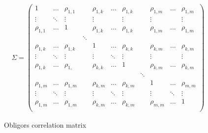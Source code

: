 \documentclass[a4paper,12pt,final]{article}
\begin{document}
\begin{figure}[h!]
\begin{displaymath}
\begin{array}{c}
\Sigma=
\left(
\begin{array}{ccccccccccc}
1           & \dots    & \rho_{1,1}  &          & \rho_{1,k}  & \dots   & \rho_{1,k}  &         & \rho_{1,m}  & \dots      & \rho_{1,m}  \\
\vdots      & \ddots   & \vdots      &          & \vdots      &         & \vdots      &         & \vdots      &            & \vdots      \\
\rho_{1,1}  & \dots    & 1           &          & \rho_{1,k}  & \dots   & \rho_{1,k}  &         & \rho_{1,m}  & \dots      & \rho_{1,m}  \\

            &          &             & \ddots   &             &         &             &         &             &            &             \\

\rho_{1,k}  & \dots    & \rho_{1,k}  &          & 1           & \dots   & \rho_{k,k}  &         & \rho_{k,m}  & \dots      & \rho_{k,m}  \\
\vdots      & \ddots   & \vdots      &          & \vdots      & \ddots  & \vdots      &         & \vdots      &            & \vdots      \\
\rho_{1,k}  & \dots    & \rho_{1, }  &          & \rho_{k,k}  & \dots   & 1           &         & \rho_{k,m}  & \dots      & \rho_{k,m}  \\

            &          &             &          &             &         &             & \ddots  &             &            &             \\

\rho_{1,m}  & \dots    & \rho_{1,m}  &          & \rho_{k,m}  & \dots   & \rho_{k,m}  &         & 1           & \dots      & \rho_{m,m}  \\
\vdots      & \ddots   & \vdots      &          & \vdots      & \ddots  & \vdots      &         & \vdots      & \ddots     & \vdots      \\
\rho_{1,m}  & \dots    & \rho_{1,m}  &          & \rho_{k,m}  & \dots   & \rho_{k,m}  &         & \rho_{m,m}  & \dots      & 1           \\
\end{array}
\right)
\end{array}
\end{displaymath}
\caption{Obligors correlation matrix}
\label{obligorcorrel}
\end{figure}
\end{document}
